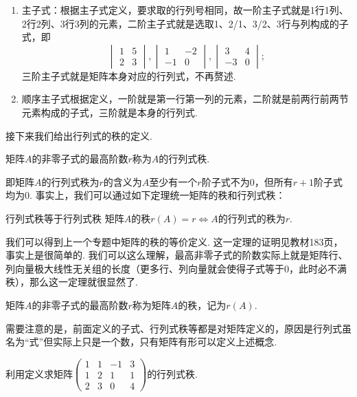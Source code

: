 \begin{solution}
\begin{enumerate}
        \item 主子式：根据主子式定义，要求取的行列号相同，故一阶主子式就是1行1列、2行2列、3行3列的元素，二阶主子式就是选取1、2/1、3/2、3行与列构成的子式，即
              \[\begin{vmatrix}
                      1 & 5 \\ 2 & 3
                  \end{vmatrix},\begin{vmatrix}
                      1 & -2 \\ -1 & 0
                  \end{vmatrix},\begin{vmatrix}
                      3 & 4 \\ -3 & 0
                  \end{vmatrix};\]
              三阶主子式就是矩阵本身对应的行列式，不再赘述.

        \item 顺序主子式根据定义，一阶就是第一行第一列的元素，二阶就是前两行前两节元素构成的子式，三阶就是本身的行列式.
    \end{enumerate}
\end{solution}

接下来我们给出行列式的秩的定义.
\begin{definition}{}{}
    矩阵$A$的非零子式的最高阶数$r$称为$A$的行列式秩.
\end{definition}
即矩阵$A$的行列式秩为$r$的含义为$A$至少有一个$r$阶子式不为0，但所有$r+1$阶子式均为0. 事实上，我们可以通过如下定理统一矩阵的秩和行列式秩：
\begin{theorem}{}{行列式秩等于行列式秩}
    矩阵$A$的秩$r(A)=r \iff A$的行列式的秩为$r$.
\end{theorem}
我们可以得到上一个专题中矩阵的秩的等价定义. 这一定理的证明见教材183页，事实上是很简单的. 我们可以这么理解，最高非零子式的阶数实际上就是矩阵行、列向量极大线性无关组的长度（更多行、列向量就会使得子式等于0，此时必不满秩），那么这一定理就很显然了.

\begin{definition}{}{}
    矩阵$A$的非零子式的最高阶数$r$称为矩阵$A$的秩，记为$r(A)$.
\end{definition}

需要注意的是，前面定义的子式、行列式秩等都是对矩阵定义的，原因是行列式虽名为``式''但实际上只是一个数，只有矩阵有形可以定义上述概念.
\begin{example}{}{}
    利用定义求矩阵$\begin{pmatrix}
            1 & 1 & -1 & 3 \\ 1 & 2 & 1 & 1 \\ 2 & 3 & 0 & 4
        \end{pmatrix}$的行列式秩.
\end{example}


